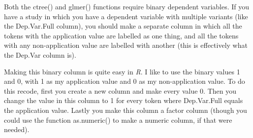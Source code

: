 \documentclass[
  10pt,
  letterpaper]{article}
\renewcommand\texttt[1]{{\ttfamily\color{BrickRed}#1}}
\begin{document}
\begin{tcolorbox}[enhanced jigsaw, colbacktitle=quarto-callout-tip-color!10!white, opacityback=0, left=2mm, breakable, bottomrule=.15mm, colback=white, colframe=quarto-callout-tip-color-frame, toprule=.15mm, arc=.35mm, rightrule=.15mm, toptitle=1mm, opacitybacktitle=0.6, bottomtitle=1mm, coltitle=black, leftrule=.75mm, titlerule=0mm, title=\textcolor{quarto-callout-tip-color}{\faLightbulb}\hspace{0.5em}{A Note on Dependent Variables with 3+ levels}]

Both the \texttt{ctree()} and \texttt{glmer()} functions require binary
dependent variables. If you have a study in which you have a dependent
variable with multiple variants (like the \texttt{Dep.Var.Full} column),
you should make a separate column in which all the tokens with the
application value are labelled as one thing, and all the tokens with any
non-application value are labelled with another (this is effectively
what the \texttt{Dep.Var} column is).

Making this binary column is quite easy in \emph{R}. I like to use the
binary values \texttt{1} and \texttt{0}, with \texttt{1} as my
application value and \texttt{0} as my non-application value. To do this
recode, first you create a new column and make every value \texttt{0}.
Then you change the value in this column to \texttt{1} for every token
where \texttt{Dep.Var.Full} equals the application value. Lastly you
make this column a factor column (though you could use the function
\texttt{as.numeric()} to make a numeric column, if that were needed).

\end{tcolorbox}
\end{document}
